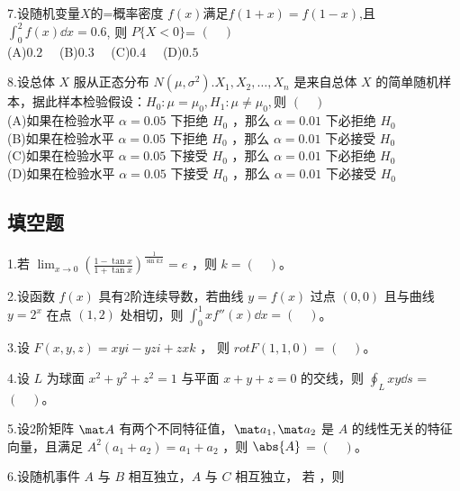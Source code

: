 7.设随机变量$X$的=概率密度 $f(x)$满足$f(1+x)=f(1-x)$,且 $\int_0^2 f(x)\dd{x}=0.6$, 则 $P\{X<0\}$= $(\quad)$\\
(A)$0.2 \quad$
(B)$0.3 \quad$
(C)$0.4 \quad$
(D)$0.5 \quad$


8.设总体 $X$ 服从正态分布 $N(\mu,\sigma^2).X_1,X_2,\dots,X_n$ 是来自总体 $X$ 的简单随机样本，据此样本检验假设：$H_0:\mu=\mu_0,H_1:\mu\neq \mu_0,$则 $(\quad)$\\
(A)如果在检验水平 $\alpha=0.05$ 下拒绝 $H_0$ ，那么 $\alpha=0.01$ 下必拒绝 $H_0$\\
(B)如果在检验水平 $\alpha=0.05$ 下拒绝 $H_0$ ，那么 $\alpha=0.01$ 下必接受 $H_0$\\
(C)如果在检验水平 $\alpha=0.05$ 下接受 $H_0$ ，那么 $\alpha=0.01$ 下必拒绝 $H_0$\\
(D)如果在检验水平 $\alpha=0.05$ 下接受 $H_0$ ，那么 $\alpha=0.01$ 下必接受 $H_0$

\subsection{填空题}
1.若 $\displaystyle \lim_{x \to  0} (\frac{1-\tan x}{1+\tan x})^\frac{1}{\sin kx}=e$ ，则 $k=(\quad)$。

2.设函数 $f(x)$ 具有2阶连续导数，若曲线 $y=f(x)$ 过点 $(0,0)$ 且与曲线 $y=2^x$ 在点 $(1,2)$ 处相切，则 $\int_0^1 xf''(x) \dd{x}= (\quad)$。

3.设 $F(x,y,z)=xyi-yzi+zxk$ ， 则 $rot  F(1,1,0)$ = $(\quad)$。

4.设 $L$ 为球面 $x^2+y^2+z^2=1$ 与平面 $x+y+z=0$ 的交线，则 $\oint_L xy\dd{s}$ = $(\quad)$。

5.设2阶矩阵 $\mat A$ 有两个不同特征值，$\mat a_1,\mat a_2$  是 $A$ 的线性无关的特征向量，且满足 $A^2(a_1+a_2)=a_1+a_2$ ，则 $\abs{A}$ = $(\quad)$。

6.设随机事件 $A$ 与 $B$ 相互独立，$A$ 与 $C$ 相互独立， 若 ，则